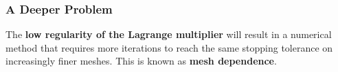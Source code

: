 \documentclass[aspectratio=169,xcolor=dvipsnames,11pt]{beamer}
\begin{document}
 \begin{frame}\frametitle{A Deeper Problem}
\centering
The \textbf{low regularity of the Lagrange multiplier} will result in a numerical method that requires more iterations to reach the same stopping tolerance on increasingly finer meshes. This is known as \textbf{mesh dependence}.
\end{frame}


    
    
    
    
    
    
    
    
    
    
    
    
    
\end{document}
